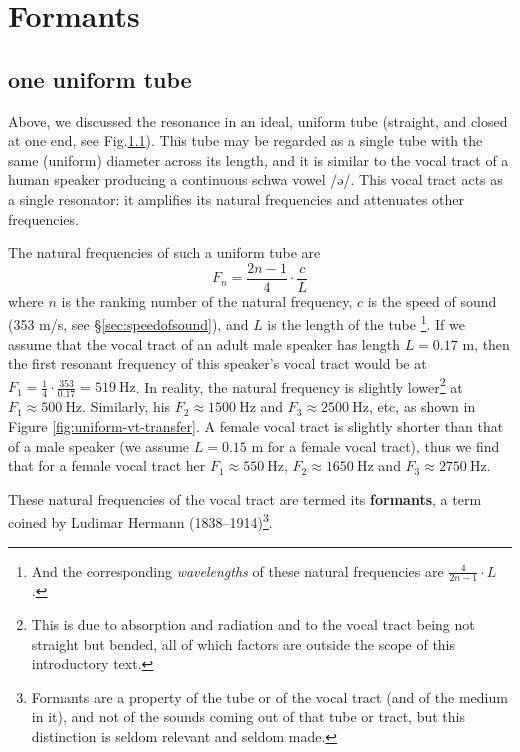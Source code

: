\documentclass[
]{book}
\begin{document}
\section{Formants}\label{sec:formants}

\subsection{one uniform tube}\label{sec:onetube}

Above, we discussed the resonance in an ideal, uniform tube (straight, and closed at one end, see Fig.\ref{sec:onetube}). This tube may be regarded as a single tube with the same (uniform) diameter across its length, and it is similar to the vocal tract of a human speaker producing a continuous schwa vowel /ə/. This vocal tract acts as a single resonator: it amplifies its natural frequencies and attenuates other frequencies.

The natural frequencies of such a uniform tube are
\[F_n = \frac{2n-1}{4} \cdot \frac{c}{L}\]
where \(n\) is the ranking number of the natural frequency, \(c\) is the speed of sound (353 m/s, see §\ref{sec:speedofsound}), and \(L\) is the length of the tube \citep[139]{Stevens_1998} \footnote{And the corresponding \emph{wavelengths} of these natural frequencies are \(\frac{4}{2n-1}\cdot L\) \citep[60]{Nooteboom_Cohen_1984}.}.
If we assume that the vocal tract of an adult male speaker has length \(L=0.17\) m, then the first resonant frequency of this speaker's vocal tract would be at \(F_1 = \frac{1}{4} \cdot \frac{353}{0.17} = 519\ \textrm{Hz}\). In reality, the natural frequency is slightly lower\footnote{This is due to absorption and radiation and to the vocal tract being not straight but bended, all of which factors are outside the scope of this introductory text.} at \(F_1 \approx 500\ \textrm{Hz}\).
Similarly, his \(F_2 \approx 1500\ \textrm{Hz}\) and \(F_3 \approx 2500\ \textrm{Hz}\), etc, as shown in Figure \ref{fig:uniform-vt-transfer}.
A female vocal tract is slightly shorter than that of a male speaker (we assume \(L=0.15\) m for a female vocal tract), thus we find that for a female vocal tract her \(F_1 \approx 550\ \textrm{Hz}\), \(F_2 \approx 1650\ \textrm{Hz}\) and \(F_3 \approx 2750\ \textrm{Hz}\).

These natural frequencies of the vocal tract are termed its \textbf{formants}, a term coined by Ludimar Hermann (1838--1914)\footnote{Formants are a property of the tube or of the vocal tract (and of the medium in it), and not of the sounds coming out of that tube or tract, but this distinction is seldom relevant and seldom made.}.
\end{document}
